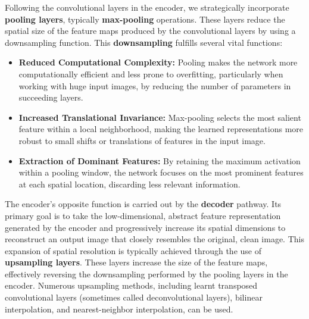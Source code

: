 \documentclass[12pt, conference]{IEEEtran}
\begin{document}
Following the convolutional layers in the encoder, we strategically incorporate \textbf{pooling layers}, typically \textbf{max-pooling} operations. These layers reduce the spatial size of the feature maps produced by the convolutional layers by using a downsampling function. This \textbf{downsampling }fulfills several vital functions:

\begin{itemize}
    \item \textbf{Reduced Computational Complexity:} Pooling makes the network more computationally efficient and less prone to overfitting, particularly when working with huge input images, by reducing the number of parameters in succeeding layers.
    \item \textbf{Increased Translational Invariance:} Max-pooling selects the most salient feature within a local neighborhood, making the learned representations more robust to small shifts or translations of features in the input image.
    \item \textbf{Extraction of Dominant Features:} By retaining the maximum activation within a pooling window, the network focuses on the most prominent features at each spatial location, discarding less relevant information.
\end{itemize}

The encoder's opposite function is carried out by the \textbf{decoder} pathway. Its primary goal is to take the low-dimensional, abstract feature representation generated by the encoder and progressively increase its spatial dimensions to reconstruct an output image that closely resembles the original, clean image. This expansion of spatial resolution is typically achieved through the use of \textbf{upsampling layers}. These layers increase the size of the feature maps, effectively reversing the downsampling performed by the pooling layers in the encoder. Numerous upsampling methods, including learnt transposed convolutional layers (sometimes called deconvolutional layers), bilinear interpolation, and nearest-neighbor interpolation, can be used.
\end{document}
